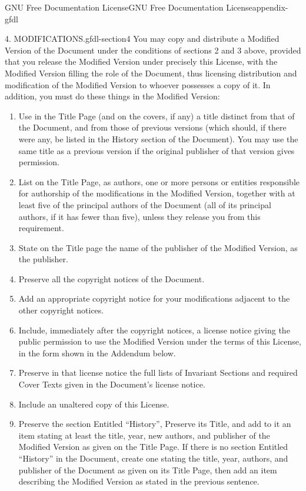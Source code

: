 \documentclass[oneside,10pt,]{book}
\numberwithin{equation}{section}
\begin{document}
\begin{appendixptx}{GNU Free Documentation License}{}{GNU Free Documentation License}{}{}{appendix-gfdl}
\begin{paragraphs}{4. MODIFICATIONS.}{gfdl-section4}
\hypertarget{p-722}{}%
You may copy and distribute a Modified Version of the Document under the conditions of sections 2 and 3 above, provided that you release the Modified Version under precisely this License, with the Modified Version filling the role of the Document, thus licensing distribution and modification of the Modified Version to whoever possesses a copy of it. In addition, you must do these things in the Modified Version:%
\leavevmode%
\begin{enumerate}[label=\Alph*.]
\item\hypertarget{li-35}{}\hypertarget{p-723}{}%
Use in the Title Page (and on the covers, if any) a title distinct from that of the Document, and from those of previous versions (which should, if there were any, be listed in the History section of the Document). You may use the same title as a previous version if the original publisher of that version gives permission.%
\item\hypertarget{li-36}{}\hypertarget{p-724}{}%
List on the Title Page, as authors, one or more persons or entities responsible for authorship of the modifications in the Modified Version, together with at least five of the principal authors of the Document (all of its principal authors, if it has fewer than five), unless they release you from this requirement.%
\item\hypertarget{li-37}{}\hypertarget{p-725}{}%
State on the Title page the name of the publisher of the Modified Version, as the publisher.%
\item\hypertarget{li-38}{}\hypertarget{p-726}{}%
Preserve all the copyright notices of the Document.%
\item\hypertarget{li-39}{}\hypertarget{p-727}{}%
Add an appropriate copyright notice for your modifications adjacent to the other copyright notices.%
\item\hypertarget{li-40}{}\hypertarget{p-728}{}%
Include, immediately after the copyright notices, a license notice giving the public permission to use the Modified Version under the terms of this License, in the form shown in the Addendum below.%
\item\hypertarget{li-41}{}\hypertarget{p-729}{}%
Preserve in that license notice the full lists of Invariant Sections and required Cover Texts given in the Document's license notice.%
\item\hypertarget{li-42}{}\hypertarget{p-730}{}%
Include an unaltered copy of this License.%
\item\hypertarget{li-43}{}\hypertarget{p-731}{}%
Preserve the section Entitled ``History'', Preserve its Title, and add to it an item stating at least the title, year, new authors, and publisher of the Modified Version as given on the Title Page. If there is no section Entitled ``History'' in the Document, create one stating the title, year, authors, and publisher of the Document as given on its Title Page, then add an item describing the Modified Version as stated in the previous sentence.%

\end{enumerate}
\end{paragraphs}
\end{appendixptx}
\end{document}
